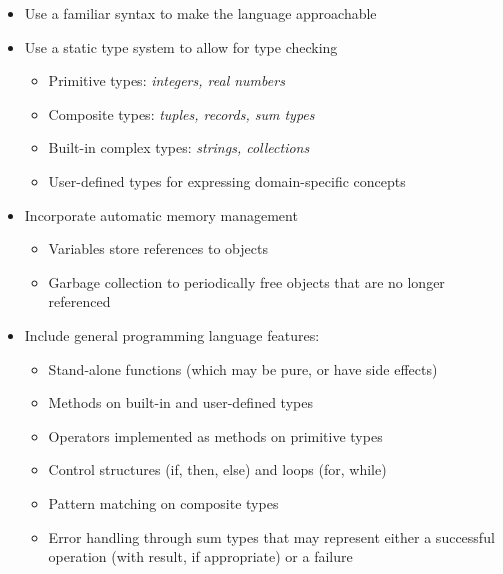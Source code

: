 \documentclass[11pt]{report}
\begin{document}
\begin{itemize}
    \item Use a familiar syntax to make the language approachable
    
    \item Use a static type system to allow for type checking
    
    \begin{itemize}
        \item Primitive types: \textit{integers, real numbers}
        
        \item Composite types: \textit{tuples, records, sum types}
        
        \item Built-in complex types: \textit{strings, collections}
        
        \item User-defined types for expressing domain-specific concepts
    \end{itemize}
    
    \item Incorporate automatic memory management

    \begin{itemize}
        \item Variables store references to objects

        \item Garbage collection to periodically free objects that are no longer referenced
    \end{itemize}

    \item Include general programming language features:

    \begin{itemize}
        \item Stand-alone functions (which may be pure, or have side effects)
    
        \item Methods on built-in and user-defined types
    
        \item Operators implemented as methods on primitive types
    
        \item Control structures (if, then, else) and loops (for, while)
    
        \item Pattern matching on composite types
    
        \item Error handling through sum types that may represent either a successful operation (with result, if appropriate) or a failure
    \end{itemize}


\end{itemize}
\end{document}
